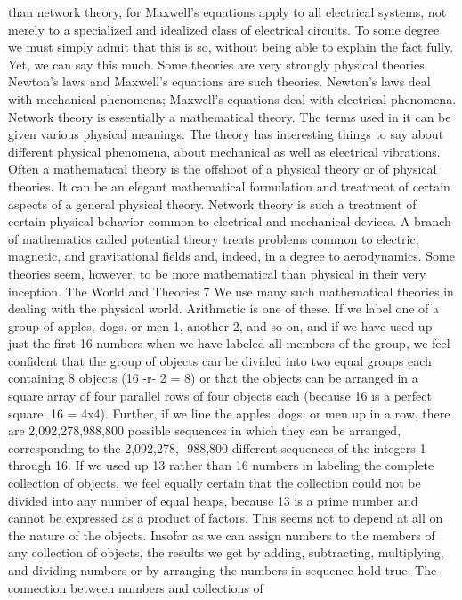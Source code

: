 than network theory, for Maxwell’s equations apply to all electrical
systems, not merely to a specialized and idealized class of electrical
circuits.
To some degree we must simply admit that this is so, without
being able to explain the fact fully. Yet, we can say this much.
Some theories are very strongly physical theories. Newton’s laws
and Maxwell’s equations are such theories. Newton’s laws deal
with mechanical phenomena; Maxwell’s equations deal with electrical
phenomena. Network theory is essentially a mathematical
theory. The terms used in it can be given various physical meanings.
The theory has interesting things to say about different physical
phenomena, about mechanical as well as electrical vibrations.
Often a mathematical theory is the offshoot of a physical theory
or of physical theories. It can be an elegant mathematical formulation
and treatment of certain aspects of a general physical theory.
Network theory is such a treatment of certain physical behavior
common to electrical and mechanical devices. A branch of mathematics
called potential theory treats problems common to electric,
magnetic, and gravitational fields and, indeed, in a degree to aerodynamics.
Some theories seem, however, to be more mathematical
than physical in their very inception.
The World and Theories 7
We use many such mathematical theories in dealing with the
physical world. Arithmetic is one of these. If we label one of a
group of apples, dogs, or men 1, another 2, and so on, and if we
have used up just the first 16 numbers when we have labeled all
members of the group, we feel confident that the group of objects
can be divided into two equal groups each containing 8 objects
(16 -r- 2 = 8) or that the objects can be arranged in a square
array of four parallel rows of four objects each (because 16 is a
perfect square; 16 = 4x4). Further, if we line the apples, dogs,
or men up in a row, there are 2,092,278,988,800 possible sequences
in which they can be arranged, corresponding to the 2,092,278,-
988,800 different sequences of the integers 1 through 16. If we used
up 13 rather than 16 numbers in labeling the complete collection
of objects, we feel equally certain that the collection could not be
divided into any number of equal heaps, because 13 is a prime
number and cannot be expressed as a product of factors.
This seems not to depend at all on the nature of the objects.
Insofar as we can assign numbers to the members of any collection
of objects, the results we get by adding, subtracting, multiplying,
and dividing numbers or by arranging the numbers in sequence
hold true. The connection between numbers and collections of

